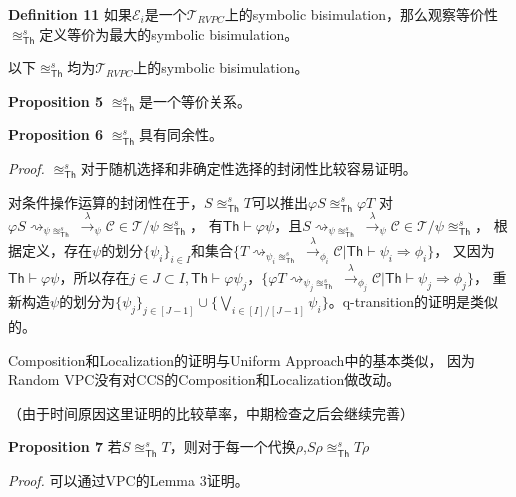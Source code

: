 \textbf{Definition 11} 如果$\mathcal{E}_i$是一个$\mathcal{T}_{RVPC}$上的symbolic bisimulation，那么观察等价性$\approxeq^s_{\mathsf{Th}}$定义等价为最大的symbolic bisimulation。

以下$\approxeq^s_{\mathsf{Th}}$均为$\mathcal{T}_{RVPC}$上的symbolic bisimulation。

\textbf{Proposition 5} $\approxeq^s_{\mathsf{Th}}$是一个等价关系。

\textbf{Proposition 6} $\approxeq^s_{\mathsf{Th}}$具有同余性。

\textit{Proof.} $\approxeq^s_{\mathsf{Th}}$对于随机选择和非确定性选择的封闭性比较容易证明。

对条件操作运算的封闭性在于，$S\approxeq^s_{\mathsf{Th}} T$可以推出$\varphi S \approxeq^s_{\mathsf{Th}} \varphi T$
对$\varphi S\rightsquigarrow_{\psi \approxeq^s_{\mathsf{Th}}}\stackrel{\lambda}{\rightarrow}_{\psi} \mathcal{C}\in \mathcal{T}/\psi \approxeq^s_{\mathsf{Th}}$，
有$\mathsf{Th}\vdash \varphi\psi$，且$S\rightsquigarrow_{\psi \approxeq^s_{\mathsf{Th}}}\stackrel{\lambda}{\rightarrow}_{\psi} \mathcal{C}\in \mathcal{T}/\psi \approxeq^s_{\mathsf{Th}}$，
根据定义，存在$\psi$的划分$\{\psi_i\}_{i\in I}$和集合$\{T\rightsquigarrow_{\psi_i \approxeq^s_{\mathsf{Th}}}\stackrel{\lambda}{\rightarrow}_{\phi_i}\mathcal{C}|\mathsf{Th}\vdash \psi_i\Rightarrow\phi_i\}$，
又因为$\mathsf{Th}\vdash \varphi\psi$，所以存在$j\in J\subset I, \mathsf{Th}\vdash \varphi\psi_j$，$\{\varphi T\rightsquigarrow_{\psi_j \approxeq^s_{\mathsf{Th}}}\stackrel{\lambda}{\rightarrow}_{\phi_j}\mathcal{C}|\mathsf{Th}\vdash \psi_j\Rightarrow\phi_j\}$，
重新构造$\psi$的划分为$\{\psi_j\}_{j\in [J-1]}\cup \{\bigvee_{i\in [I]/[J-1]}\psi_i\}$。q-transition的证明是类似的。

Composition和Localization的证明与Uniform Approach中的基本类似，
因为Random VPC没有对CCS的Composition和Localization做改动。

（由于时间原因这里证明的比较草率，中期检查之后会继续完善）

\textbf{Proposition 7} 若$S \approxeq^s_{\mathsf{Th}} T$，则对于每一个代换$\rho$,$S\rho \approxeq^s_{\mathsf{Th}} T\rho$

\textit{Proof.} 可以通过VPC的Lemma 3证明。
